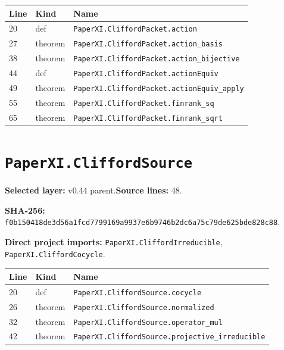 \documentclass[10pt,oneside]{book}
\begin{document}
\begin{longtable}{@{}p{}p{}p{}@{}}\toprule Line&Kind&Name\\\midrule\endhead

20&def&\nolinkurl{PaperXI.CliffordPacket.action}\\

27&theorem&\nolinkurl{PaperXI.CliffordPacket.action_basis}\\

38&theorem&\nolinkurl{PaperXI.CliffordPacket.action_bijective}\\

44&def&\nolinkurl{PaperXI.CliffordPacket.actionEquiv}\\

49&theorem&\nolinkurl{PaperXI.CliffordPacket.actionEquiv_apply}\\

55&theorem&\nolinkurl{PaperXI.CliffordPacket.finrank_sq}\\

65&theorem&\nolinkurl{PaperXI.CliffordPacket.finrank_sqrt}\\

\bottomrule\end{longtable}

\section{\texorpdfstring{\nolinkurl{PaperXI.CliffordSource}}{PaperXI.CliffordSource}}\label{module:PaperXI.CliffordSource}

\textbf{Selected layer:} v0.44 parent.\quad\textbf{Source lines:} 48.\par\textbf{SHA-256:} {\scriptsize\nolinkurl{f0b150418de3d56a1fcd7799169a9937e6b9746b2dc6a75c79de625bde828c88}}.


\textbf{Direct project imports:} \nolinkurl{PaperXI.CliffordIrreducible}, \nolinkurl{PaperXI.CliffordCocycle}.

\begin{longtable}{@{}p{}p{}p{}@{}}\toprule Line&Kind&Name\\\midrule\endhead

20&def&\nolinkurl{PaperXI.CliffordSource.cocycle}\\

26&theorem&\nolinkurl{PaperXI.CliffordSource.normalized}\\

32&theorem&\nolinkurl{PaperXI.CliffordSource.operator_mul}\\

42&theorem&\nolinkurl{PaperXI.CliffordSource.projective_irreducible}\\

\bottomrule\end{longtable}
\end{document}
